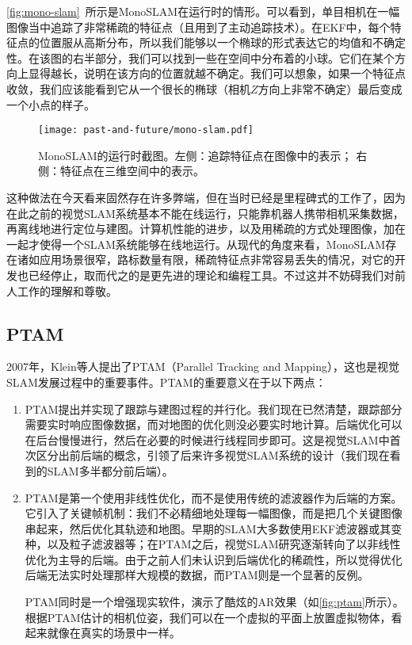 \autoref{fig:mono-slam}~所示是MonoSLAM在运行时的情形。可以看到，单目相机在一幅图像当中追踪了非常稀疏的特征点（且用到了主动追踪技术）。在EKF中，每个特征点的位置服从高斯分布，所以我们能够以一个椭球的形式表达它的均值和不确定性。在该图的右半部分，我们可以找到一些在空间中分布着的小球。它们在某个方向上显得越长，说明在该方向的位置就越不确定。我们可以想象，如果一个特征点收敛，我们应该能看到它从一个很长的椭球（相机$Z$方向上非常不确定）最后变成一个小点的样子。

\begin{figure}[!htp]
	\centering
	\texttt{[image: past-and-future/mono-slam.pdf]}
	\caption{MonoSLAM的运行时截图。左侧：追踪特征点在图像中的表示； 右侧：特征点在三维空间中的表示。}
	\label{fig:mono-slam}
\end{figure}

这种做法在今天看来固然存在许多弊端，但在当时已经是里程碑式的工作了，因为在此之前的视觉SLAM系统基本不能在线运行，只能靠机器人携带相机采集数据，再离线地进行定位与建图。计算机性能的进步，以及用稀疏的方式处理图像，加在一起才使得一个SLAM系统能够在线地运行。从现代的角度来看，MonoSLAM存在诸如应用场景很窄，路标数量有限，稀疏特征点非常容易丢失的情况，对它的开发也已经停止，取而代之的是更先进的理论和编程工具。不过这并不妨碍我们对前人工作的理解和尊敬。

\subsection{PTAM}

2007年，Klein等人提出了PTAM（Parallel Tracking and Mapping）\textsuperscript{\cite{Klein2007}}，这也是视觉SLAM发展过程中的重要事件。PTAM的重要意义在于以下两点：
\begin{enumerate}
	\item PTAM提出并实现了跟踪与建图过程的并行化。我们现在已然清楚，跟踪部分需要实时响应图像数据，而对地图的优化则没必要实时地计算。后端优化可以在后台慢慢进行，然后在必要的时候进行线程同步即可。这是视觉SLAM中首次区分出前后端的概念，引领了后来许多视觉SLAM系统的设计（我们现在看到的SLAM多半都分前后端）。
	\item PTAM是第一个使用非线性优化，而不是使用传统的滤波器作为后端的方案。它引入了关键帧机制：我们不必精细地处理每一幅图像，而是把几个关键图像串起来，然后优化其轨迹和地图。早期的SLAM大多数使用EKF滤波器或其变种，以及粒子滤波器等；在PTAM之后，视觉SLAM研究逐渐转向了以非线性优化为主导的后端。由于之前人们未认识到后端优化的稀疏性，所以觉得优化后端无法实时处理那样大规模的数据，而PTAM则是一个显著的反例。

	\hspace{2em}PTAM同时是一个增强现实软件，演示了酷炫的AR效果（如\autoref{fig:ptam}所示）。根据PTAM估计的相机位姿，我们可以在一个虚拟的平面上放置虚拟物体，看起来就像在真实的场景中一样。
\end{enumerate}

